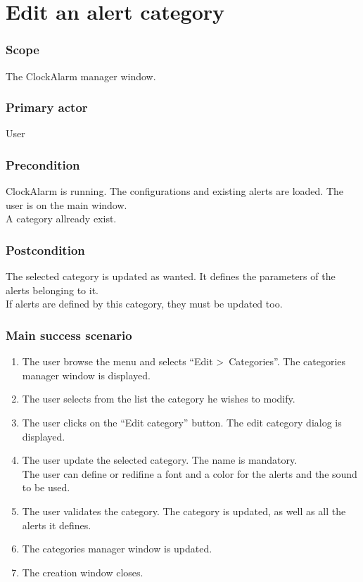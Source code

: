 \section{Edit an alert category}\label{subsec:usecase_edit_category}

\subsubsection{Scope}
The ClockAlarm manager window.
\subsubsection{Primary actor}
User
\subsubsection{Precondition}
ClockAlarm is running. The configurations and existing alerts are loaded. The user is on the main window.
\\A category allready exist.
\subsubsection{Postcondition}
The selected category is updated as wanted. It defines the parameters of the alerts belonging to it.
\\ If alerts are defined by this category, they must be updated too.
\subsubsection{Main success scenario}
\begin{enumerate}
	\item The user browse the menu and selects ``Edit \textgreater~Categories''. The categories manager window is displayed. 
	\item The user selects from the list the category he wishes to modify.
	\item The user clicks on the ``Edit category'' button. The edit category dialog is displayed.
	\item\label{itm:eaac_enter_sc}The user update the selected category. The name is mandatory. \\The user can define or redifine a font and a color for the alerts and the sound to be used.
	\item\label{itm:eaac_validate_sc} The user validates the category. The category is updated, as well as all the alerts it defines.
	\item The categories manager window is updated.
	\item The creation window closes.
\end{enumerate}

